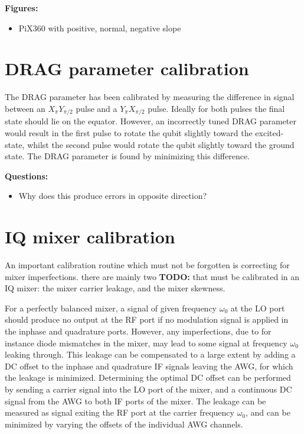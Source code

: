       \textbf{Figures:}
      \begin{itemize}
        \item PiX360 with positive, normal, negative slope
      \end{itemize}

    \section{DRAG parameter calibration}
      The DRAG parameter has been calibrated by measuring the difference in signal between an $X_{\pi} Y_{\pi/2}$ pulse and a $Y_{\pi} X_{\pi/2}$ pulse. Ideally for both pulses the final state should lie on the equator. However, an incorrectly tuned DRAG parameter would result in the first pulse to rotate the qubit slightly toward the excited-state, whilst the second pulse would rotate the qubit slightly toward the ground state. The DRAG parameter is found by minimizing this difference.

      \textbf{Questions:}
      \begin{itemize}
        \item Why does this produce errors in opposite direction?
      \end{itemize}

    \section{IQ mixer calibration}
      \label{sec:Mixer calibration}
      An important calibration routine which must not be forgotten is correcting for mixer imperfections. there are mainly two \textbf{TODO:} that must be calibrated in an IQ mixer: the mixer carrier leakage, and the mixer skewness.

      For a perfectly balanced mixer, a signal of given frequency $\omega_0$ at the LO port should produce no output at the RF port if no modulation signal is applied in the inphase and quadrature ports.  However, any imperfections, due to for instance diode mismatches in the mixer, may lead to some signal at frequency $\omega_0$ leaking through. This leakage can be compensated to a large extent by adding a DC offset to the inphase and quadrature IF signals leaving the AWG, for which the leakage is minimized. Determining the optimal DC offset can be performed by sending a carrier signal into the LO port of the mixer, and a continuous DC signal from the AWG to both IF ports of the mixer. The leakage can be measured as signal exiting the RF port at the carrier frequency $\omega_0$, and can be minimized by varying the offsets of the individual AWG channels.

